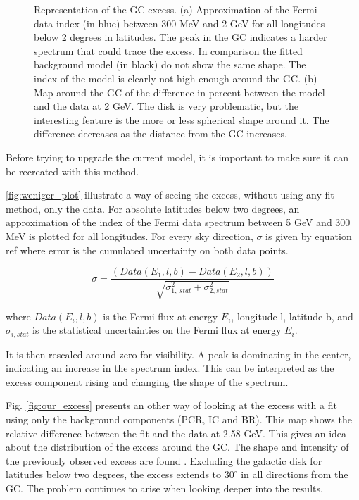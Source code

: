 \begin{figure}[h]
\begin{minipage}[h]{0.45\textwidth}
	  \subcaption{}
	  \label{fig:our_excess}
  \end{minipage}
  \caption[GC excess.]{Representation of the GC excess. (a) Approximation of the Fermi data index (in blue) between 300 MeV and 2 GeV for all longitudes below 2 degrees in latitudes. The peak in the GC indicates a harder spectrum that could trace the excess. In comparison the fitted background model (in black) do not show the same shape. The index of the model is clearly not high enough around the GC. (b) Map around the GC of the difference  in percent between the model and the data at 2 GeV. The disk is very problematic, but the interesting feature is the more or less spherical shape around it. The difference decreases as the distance from the GC increases.}
  \label{fig:GC_excess}	 
\end{figure}

Before trying to upgrade the current model, it is important to make sure it can be recreated with this method. 

\ref{fig:weniger_plot} illustrate a way of seeing the excess, without using any fit method, only the data. For absolute latitudes below two degrees, an approximation of the index of the Fermi data spectrum between 5 GeV and 300 MeV is plotted for all longitudes. For every sky direction, $\sigma$ is given by equation ref where error is the cumulated uncertainty on both data points.

\begin{equation}
\sigma = \frac{\left(Data(E_1, l, b) - Data(E_2, l, b) \right)}{\sqrt{\sigma_{1,\ stat}^2 + \sigma_{2, stat}^2}}
\end{equation}

where $Data(E_i,l,b)$ is the Fermi flux at energy $E_i$, longitude l, latitude b, and $\sigma_{i, stat}$ is the statistical uncertainties on the Fermi flux at energy $E_i$.

It is then rescaled around zero for visibility. A peak is dominating in the center, indicating an increase in the spectrum index. This can be interpreted as the excess component rising and changing the shape of the spectrum.

Fig. \ref{fig:our_excess} presents an other way of looking at the excess with a fit using only the background components (PCR, IC and BR). This map shows the relative difference between the fit and the data at 2.58 GeV. This gives an idea about the distribution of the excess around the GC. The shape and intensity of the previously observed excess are found \cite{Hooper2011}. Excluding the galactic disk for latitudes below two degrees, the excess extends to $30^\circ$ in all directions from the GC. The problem continues to arise when looking deeper into the results.


